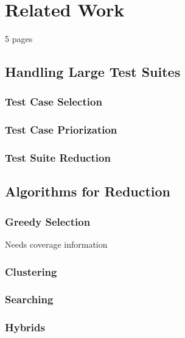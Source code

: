 
\chapter{Related Work}\label{chapter:related}

5 pages

\section{Handling Large Test Suites}

\subsection{Test Case Selection}

\subsection{Test Case Priorization}

\subsection{Test Suite Reduction}

\section{Algorithms for Reduction}

\subsection{Greedy Selection}

Needs coverage information

\subsection{Clustering}

\subsection{Searching}

\subsection{Hybrids}
